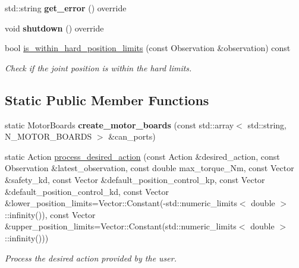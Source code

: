 \begin{DoxyCompactItemize}
\item 
\mbox{\label{classblmc__robots_1_1NJointBlmcRobotDriver_a2c45384d83e688618a589cb13797e3bc}} 
std\+::string {\bfseries get\+\_\+error} () override
\item 
\mbox{\label{classblmc__robots_1_1NJointBlmcRobotDriver_a4d57e567a2cd393ee9e4af4bcdde94f0}} 
void {\bfseries shutdown} () override
\item 
bool \hyperlink{classblmc__robots_1_1NJointBlmcRobotDriver_a1d9aedee4887a6f34c07481c4520cb5a}{is\+\_\+within\+\_\+hard\+\_\+position\+\_\+limits} (const Observation \&observation) const
\begin{DoxyCompactList}\small\item\em Check if the joint position is within the hard limits. \end{DoxyCompactList}\end{DoxyCompactItemize}
\subsection*{Static Public Member Functions}
\begin{DoxyCompactItemize}
\item 
\mbox{\label{classblmc__robots_1_1NJointBlmcRobotDriver_a30f5a6037441bff26ab208bbb91c0c39}} 
static Motor\+Boards {\bfseries create\+\_\+motor\+\_\+boards} (const std\+::array$<$ std\+::string, N\+\_\+\+M\+O\+T\+O\+R\+\_\+\+B\+O\+A\+R\+DS $>$ \&can\+\_\+ports)
\item 
static Action \hyperlink{classblmc__robots_1_1NJointBlmcRobotDriver_a8f7aaf3bc10c0d4d0f2c7a38f594c166}{process\+\_\+desired\+\_\+action} (const Action \&desired\+\_\+action, const Observation \&latest\+\_\+observation, const double max\+\_\+torque\+\_\+\+Nm, const Vector \&safety\+\_\+kd, const Vector \&default\+\_\+position\+\_\+control\+\_\+kp, const Vector \&default\+\_\+position\+\_\+control\+\_\+kd, const Vector \&lower\+\_\+position\+\_\+limits=Vector\+::\+Constant(-\/std\+::numeric\+\_\+limits$<$ double $>$\+::infinity()), const Vector \&upper\+\_\+position\+\_\+limits=Vector\+::\+Constant(std\+::numeric\+\_\+limits$<$ double $>$\+::infinity()))
\begin{DoxyCompactList}\small\item\em Process the desired action provided by the user. \end{DoxyCompactList}\end{DoxyCompactItemize}
